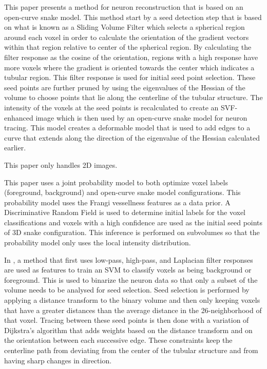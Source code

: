 \documentclass[12pt]{article}
\begin{document}
\begin{enumerate}[label={}]
			This paper presents a method for neuron
			reconstruction that is based on an
			open-curve snake model. This method
			start by a seed detection step that is
			based on what is known as a Sliding Volume
			Filter which selects a spherical region
			around each voxel in order to calculate
			the orientation of the gradient vectors
			within that region relative to center of
			the spherical region. By calculating the
			filter response as the cosine of the
			orientation, regions with a high response
			have more voxels where the gradient is
			oriented towards the center which
			indicates a tubular region. This filter
			response is used for initial seed point
			selection. These seed points are further
			pruned by using the eigenvalues of the
			Hessian of the volume to choose points
			that lie along the centerline of the
			tubular structure. The intensity of the
			voxels at the seed points is recalculated to
			create an SVF-enhanced image which is then
			used by an open-curve snake model for
			neuron tracing. This model creates a
			deformable model that is used to add edges
			to a curve that extends along the
			direction of the eigenvalue of the Hessian
			calculated earlier.

			This paper only handles 2D images.

			This paper uses a joint probability model
			to both optimize voxel labels (foreground,
			background) and open-curve snake model
			configurations. This probability model
			uses the Frangi vessellness features as a
			data prior. A Discriminative Random
			Field is used to determine initial labels
			for the voxel classifications and voxels
			with a high confidence are used as the 
			initial seed points of 3D snake configuration.
			This inference is performed on subvolumes
			so that the probability model only uses
			the local intensity distribution.

			In \autocite{Jimenez2013}, a method that
			first uses low-pass,
			high-pass, and Laplacian filter responses
			are used as features
			to train an SVM to classify voxels as
			being background or foreground. This is
			used to binarize the neuron data so that
			only a subset of the volume needs to be
			analysed for seed selection. Seed
			selection is performed by applying a
			distance transform to the binary volume
			and then only keeping voxels that have a
			greater distances than the average
			distance in the 26-neighborhood of that
			voxel. Tracing between these seed points
			is then done with a variation of
			Dijkstra's algorithm that adds weights
			based on the distance transform
			and on the orientation between each successive
			edge. These constraints keep the centerline path
			from deviating from the center of the
			tubular structure and from having sharp
			changes in direction.


\end{enumerate}
\end{document}
